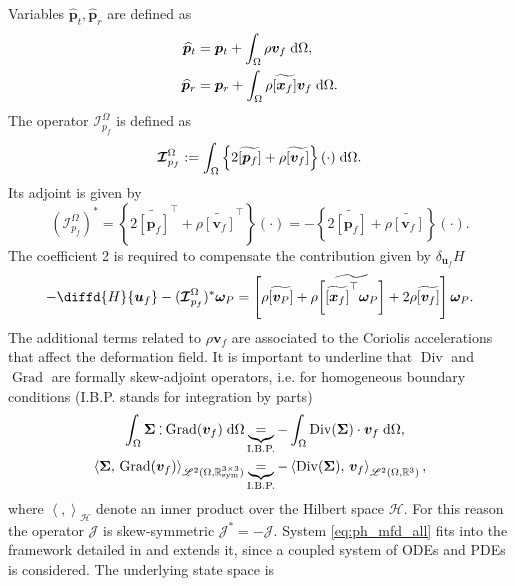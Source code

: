 \documentclass{svjour3}                     %
\DeclareMathOperator*{\Grad}{Grad}
\DeclareMathOperator*{\Div}{Div}
\newcommand{\crmat}[1]{\ensuremath{\widetilde{\left[#1\right]}}}
\def\onedot{$\mathsurround0pt\ldotp$}
\def\cddot{%
	\mathbin{\vcenter{\baselineskip.67ex
			\hbox{\onedot}\hbox{\onedot}}%
}}
\begin{document}
	Variables $\widehat{\bm{p}}_t, \widehat{\bm{p}}_r$ are defined as
	\begin{equation}
	\label{eq:mod_momenta}
	\begin{aligned}
	\widehat{\bm{p}}_t &= \bm{p}_t + \int_{\Omega} \rho \bm{v}_f \d{\Omega}, \\
	\widehat{\bm{p}}_r &= \bm{p}_r + \int_{\Omega} \rho \crmat{\bm{x}_f}\bm{v}_f \d{\Omega}. \\
	\end{aligned}
	\end{equation}
	The operator $\bm{\mathcal{I}}_{p_f}^\Omega$ is defined as 
	\begin{equation}
	\label{eq:mod_momentafl}
	\bm{\mathcal{I}}_{p_f}^\Omega := \int_\Omega \left\{2 \crmat{\bm{p}_f} + \rho \crmat{\bm{v}_f} \right\}(\cdot) \d{\Omega}.
	\end{equation}
	Its  adjoint is given by
	\begin{equation*}
	(\bm{\mathcal{I}}_{p_f}^\Omega)^* = \left\{2 \crmat{\bm{p}_f}^\top + \rho \crmat{\bm{v}_f}^\top \right\}(\cdot) = - \left\{2 \crmat{\bm{p}_f} + \rho \crmat{\bm{v}_f} \right\}(\cdot).
	\end{equation*} 
	The coefficient 2 is required to compensate the contribution given by $\delta_{\bm{u}_f} H$ 
	\[
	-\diffd{H}{\bm{u}_f} - (\bm{\mathcal{I}}_{p_f}^\Omega)^* \bm{\omega}_P = \left[\rho \crmat{\bm{v}_P} + \rho \crmat{\crmat{\bm{x}_f}^\top \bm\omega_P} + 2 \rho \crmat{\bm{v}_f} \right] \bm\omega_P.
	\]
	The additional terms related to $\rho \bm{v}_f$ are associated to the Coriolis accelerations that affect the deformation field. It is important to underline that $\Div$ and $\Grad$ are formally skew-adjoint operators, i.e. for homogeneous boundary conditions (I.B.P. stands for integration by parts)
	\begin{align*}
	\int_{\Omega} \bm\Sigma \cddot \Grad(\bm{v}_f) \d{\Omega} &\underbrace{=}_{\text{I.B.P.}} -\int_{\Omega} \Div(\bm\Sigma) \cdot \bm{v}_f \d{\Omega}, \\
	\left\langle \bm\Sigma, \, \Grad(\bm{v}_f) \right\rangle_{\mathscr{L}^2(\Omega, \mathbb{R}^{3\times 3}_{\text{sym}})} &\underbrace{=}_{\text{I.B.P.}} -\left\langle\Div(\bm\Sigma), \, \bm{v}_f \right\rangle_{\mathscr{L}^2(\Omega, \mathbb{R}^3)}, 
	\end{align*}
	where $\left\langle ,  \right\rangle_\mathscr{H}$ denote an inner product over the Hilbert space $\mathscr{H}$. For this reason the operator $\bm{\mathcal{J}}$ is skew-symmetric $\bm{\mathcal{J}}_{}^*=-\bm{\mathcal{J}}$. System \eqref{eq:ph_mfd_all} fits into the framework detailed in \cite{mehrmann2019structurepreserving} and extends it, since a coupled system of ODEs and PDEs is considered. The underlying state space is 
\end{document}
